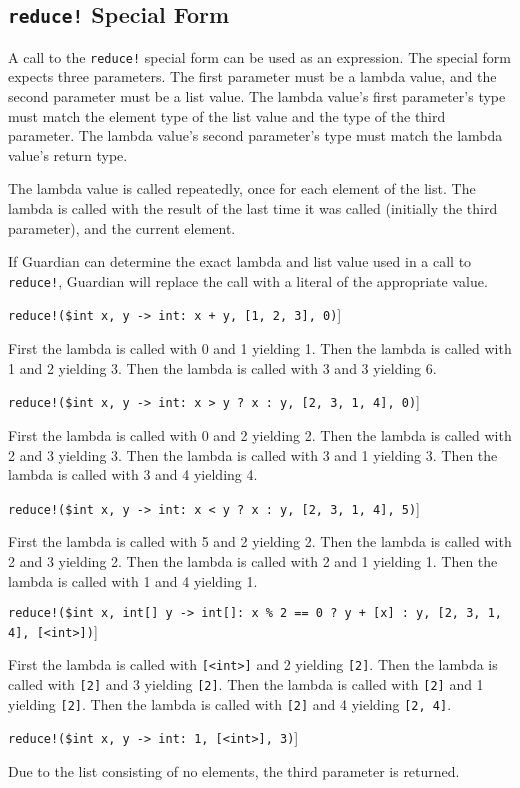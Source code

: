 
\subsection{\texttt{reduce!} Special Form}
{
	A call to the \texttt{reduce!} special form can be used as an expression.
	The special form expects three parameters.
	The first parameter must be a lambda value, and the
	second parameter must be a list value.
	The lambda value's first parameter's type
	must match the element type of the list value and the type of the third
	parameter. The lambda value's
	second parameter's type must match the lambda value's return type.
	
	The lambda value is called repeatedly, once for each element of the list.
	The lambda is called with the result of the last time it was
	called (initially the third parameter), and
	the current element.
	
	If Guardian can determine the exact lambda and list value used in a call to
	\texttt{reduce!}, Guardian will replace the call with a literal of
	the appropriate value.
	
	\begin{itemize}
	{
		\item \texttt{reduce!(\$int x, y -> int: x + y, [1, 2, 3], 0)}]
		
			First the lambda is called with 0 and 1 yielding 1.
			Then the lambda is called with 1 and 2 yielding 3.
			Then the lambda is called with 3 and 3 yielding 6.
		
		\item \texttt{reduce!(\$int x, y -> int: x > y ? x : y, [2, 3, 1, 4], 0)}]
		
			First the lambda is called with 0 and 2 yielding 2.
			Then the lambda is called with 2 and 3 yielding 3.
			Then the lambda is called with 3 and 1 yielding 3.
			Then the lambda is called with 3 and 4 yielding 4.
		
		\item \texttt{reduce!(\$int x, y -> int: x < y ? x : y, [2, 3, 1, 4], 5)}]
		
			First the lambda is called with 5 and 2 yielding 2.
			Then the lambda is called with 2 and 3 yielding 2.
			Then the lambda is called with 2 and 1 yielding 1.
			Then the lambda is called with 1 and 4 yielding 1.
			
		\item \texttt{reduce!(\$int x, int[] y -> int[]: x \% 2 == 0 ? y + [x] : y, [2, 3, 1, 4], [<int>])}]
		
			First the lambda is called with \texttt{[<int>]} and 2 yielding \texttt{[2]}.
			Then the lambda is called with \texttt{[2]} and 3 yielding \texttt{[2]}.
			Then the lambda is called with \texttt{[2]} and 1 yielding \texttt{[2]}.
			Then the lambda is called with \texttt{[2]} and 4 yielding \texttt{[2, 4]}.
			
		\item \texttt{reduce!(\$int x, y -> int: 1, [<int>], 3)}]
		
			Due to the list consisting of no elements, the third parameter
			is returned.
	}
	\end{itemize}
}














